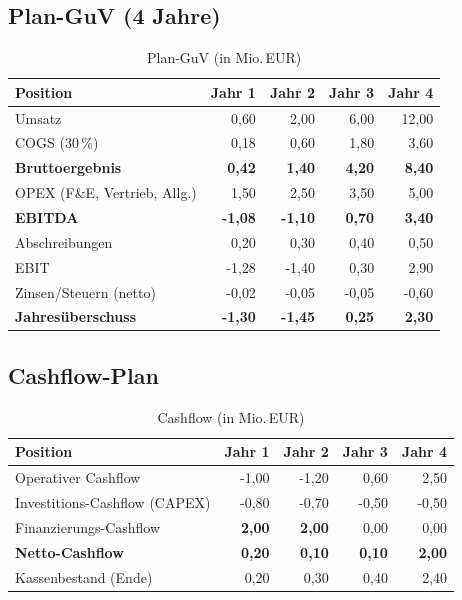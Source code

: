 \documentclass[
%
ngerman %
%
numeric %
]{wbh-assignment}
\begin{document}
\subsection{Plan-GuV (4 Jahre)}
\begin{table}[htb!]
\centering
\caption{Plan-GuV (in Mio.\,EUR)}
\begin{tabular}{l r r r r}
\textbf{Position} & \textbf{Jahr 1} & \textbf{Jahr 2} & \textbf{Jahr 3} & \textbf{Jahr 4} \\
\hline
Umsatz & 0{,}60 & 2{,}00 & 6{,}00 & 12{,}00 \\
COGS (30\,\%) & 0{,}18 & 0{,}60 & 1{,}80 & 3{,}60 \\
\textbf{Bruttoergebnis} & \textbf{0{,}42} & \textbf{1{,}40} & \textbf{4{,}20} & \textbf{8{,}40} \\
OPEX (F\&E, Vertrieb, Allg.) & 1{,}50 & 2{,}50 & 3{,}50 & 5{,}00 \\
\textbf{EBITDA} & \textbf{-1{,}08} & \textbf{-1{,}10} & \textbf{0{,}70} & \textbf{3{,}40} \\
Abschreibungen & 0{,}20 & 0{,}30 & 0{,}40 & 0{,}50 \\
EBIT & -1{,}28 & -1{,}40 & 0{,}30 & 2{,}90 \\
Zinsen/Steuern (netto) & -0{,}02 & -0{,}05 & -0{,}05 & -0{,}60 \\
\textbf{Jahresüberschuss} & \textbf{-1{,}30} & \textbf{-1{,}45} & \textbf{0{,}25} & \textbf{2{,}30} \\
\end{tabular}
\end{table}

\subsection{Cashflow-Plan}
\begin{table}[htb!]
\centering
\caption{Cashflow (in Mio.\,EUR)}
\begin{tabular}{l r r r r}
\textbf{Position} & \textbf{Jahr 1} & \textbf{Jahr 2} & \textbf{Jahr 3} & \textbf{Jahr 4} \\
\hline
Operativer Cashflow & -1{,}00 & -1{,}20 & 0{,}60 & 2{,}50 \\
Investitions-Cashflow (CAPEX) & -0{,}80 & -0{,}70 & -0{,}50 & -0{,}50 \\
Finanzierungs-Cashflow & \textbf{2{,}00} & \textbf{2{,}00} & 0{,}00 & 0{,}00 \\
\textbf{Netto-Cashflow} & \textbf{0{,}20} & \textbf{0{,}10} & \textbf{0{,}10} & \textbf{2{,}00} \\
Kassenbestand (Ende) & 0{,}20 & 0{,}30 & 0{,}40 & 2{,}40 \\
\end{tabular}
\end{table}
\end{document}
